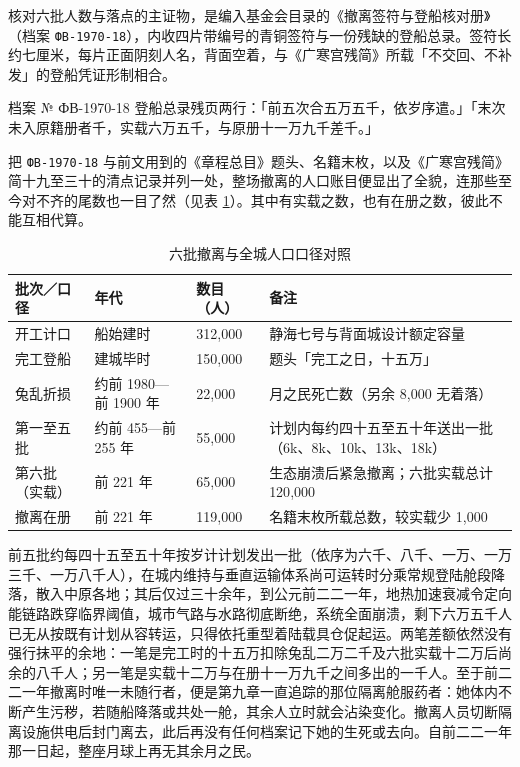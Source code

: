 核对六批人数与落点的主证物，是编入基金会目录的《撤离签符与登船核对册》（档案 \texttt{ФВ-1970-18}），内收四片带编号的青铜签符与一份残缺的登船总录。签符长约七厘米，每片正面阴刻人名，背面空着，与《广寒宫残简》所载「不交回、不补发」的登船凭证形制相合。

\begin{archive}[内部参考]{档案 № ФВ-1970-18}
登船总录残页两行：「前五次合五万五千，依岁序遣。」「末次未入原籍册者千，实载六万五千，与原册十一万九千差千。」
\end{archive}

把 \texttt{ФВ-1970-18} 与前文用到的《章程总目》题头、名籍末枚，以及《广寒宫残简》简十九至三十的清点记录并列一处，整场撤离的人口账目便显出了全貌，连那些至今对不齐的尾数也一目了然（见表 \ref{tab:evacuation}）。其中有实载之数，也有在册之数，彼此不能互相代算。

\begin{table}[htbp]
  \centering
  \caption{六批撤离与全城人口口径对照}
  \label{tab:evacuation}
  \footnotesize
  \begin{tabular}{@{}p{26mm}p{34mm}p{18mm}p{44mm}@{}}
    \toprule
    批次／口径 & 年代 & 数目（人） & 备注 \\
    \midrule
    开工计口 & 船始建时 & 312{,}000 & 静海七号与背面城设计额定容量 \\
    完工登船 & 建城毕时 & 150{,}000 & 题头「完工之日，十五万」 \\
    兔乱折损 & 约前 1980—前 1900 年 & 22{,}000 & 月之民死亡数（另余 8{,}000 无着落） \\
    第一至五批 & 约前 455—前 255 年 & 55{,}000 & 计划内每约四十五至五十年送出一批（6k、8k、10k、13k、18k） \\
    第六批（实载） & 前 221 年 & 65{,}000 & 生态崩溃后紧急撤离；六批实载总计 120{,}000 \\
    撤离在册 & 前 221 年 & 119{,}000 & 名籍末枚所载总数，较实载少 1{,}000 \\
    \bottomrule
  \end{tabular}
\end{table}

前五批约每四十五至五十年按岁计计划发出一批（依序为六千、八千、一万、一万三千、一万八千人），在城内维持与垂直运输体系尚可运转时分乘常规登陆舱段降落，散入中原各地；其后仅过三十余年，到公元前二二一年，地热加速衰减令定向能链路跌穿临界阈值，城市气路与水路彻底断绝，系统全面崩溃，剩下六万五千人已无从按既有计划从容转运，只得依托重型着陆载具仓促起运。两笔差额依然没有强行抹平的余地：一笔是完工时的十五万扣除兔乱二万二千及六批实载十二万后尚余的八千人；另一笔是实载十二万与在册十一万九千之间多出的一千人。至于前二二一年撤离时唯一未随行者，便是第九章一直追踪的那位隔离舱服药者：她体内不断产生污秽，若随船降落或共处一舱，其余人立时就会沾染变化。撤离人员切断隔离设施供电后封门离去，此后再没有任何档案记下她的生死或去向。自前二二一年那一日起，整座月球上再无其余月之民。

